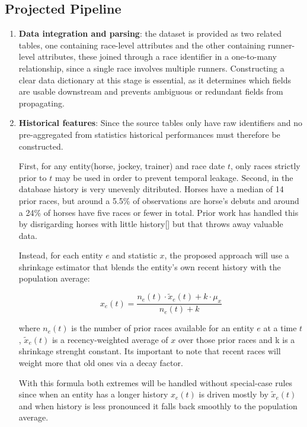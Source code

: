 \subsection{Projected Pipeline}

\begin{enumerate}
    \item \textbf{Data integration and parsing}: the dataset is provided as two related tables, one containing race-level attributes and the other containing runner-level attributes, these joined through a race identifier in a one-to-many relationship, since a single race involves multiple runners. Constructing a clear data dictionary at this stage is essential, as it determines which fields are usable downstream and prevents ambiguous or redundant fields from propagating.
    \item \textbf{Historical features}\label{historialfeat}: Since the source tables only have raw identifiers and no pre-aggregated from statistics historical performances must therefore be constructed.

    First, for any entity(horse, jockey, trainer) and race date $t$, only races strictly prior to $t$ may be used in order to prevent temporal leakage.
    Second, in the database history is very unevenly ditributed. Horses have a median of 14 prior races, but around a 5.5\% of observations are horse's debuts and around a 24\% of horses have five races or fewer in total. Prior work has handled this by disrigarding horses with little history[\cite{ejeA_davoodi2010}] but that throws away valuable data. 

    Instead, for each entity $e$ and statistic $x$, the proposed approach will use a shrinkage estimator that blends the entity's own recent history with the population average:

    \begin{equation} x_e(t) = \frac{n_e(t) \cdot \tilde{x}_e(t) + k \cdot \mu_x}{n_e(t) + k} \end{equation}

    where $n_e (t)$ is the number of prior races available for an entity $e$ at a time $t$, $\tilde{x}_e(t)$ is a recency-weighted average of $x$ over those prior races and k is a shrinkage strenght constant. Its important to note that recent races will weight more that old ones via a decay factor. 

    With this formula both extremes will be handled without special-case rules since when an entity has a longer history $x_e (t)$ is driven mostly by $\tilde{x}_e(t)$ and when history is less pronounced it falls back smoothly to the population average.


\end{enumerate}
